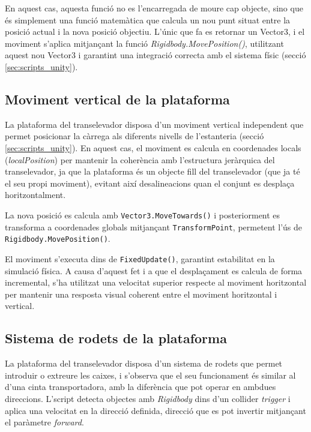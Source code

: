 \documentclass[a4paper,11pt,DIV=13,headings=normal,abstract=true,twoside=semi]{article}
\begin{document}
En aquest cas, aquesta funció  no es l'encarregada de moure cap objecte, sino que és simplement una funció matemàtica que calcula un nou punt situat entre la posició actual i la nova posició objectiu. L'únic que fa es retornar un Vector3, i el moviment s'aplica mitjançant la funció \emph{Rigidbody.MovePosition()}, utilitzant aquest nou Vector3 i garantint una integració correcta amb el sistema físic (secció \ref{sec:scripts_unity}).

\subsection*{Moviment vertical de la plataforma}

La plataforma del transelevador disposa d'un moviment vertical \cite{UnityElevatorVideo} independent que permet posicionar la càrrega als diferents nivells de l'estanteria (secció \ref{sec:scripts_unity}). En aquest cas, el moviment es calcula en coordenades locals (\emph{localPosition}) \cite{UnityTransformLocalPosition} per mantenir la coherència amb l'estructura jeràrquica del transelevador, ja que la plataforma és un objecte fill del transelevador (que ja té el seu propi moviment), evitant així desalineacions quan el conjunt es desplaça horitzontalment.

La nova posició es calcula amb \texttt{Vector3.MoveTowards()} i posteriorment es transforma a coordenades globals mitjançant \texttt{TransformPoint}, permetent l'ús de \texttt{Rigidbody.MovePosition()}.

El moviment s'executa dins de \texttt{FixedUpdate()}, garantint estabilitat en la simulació física. A causa d'aquest fet i a que el desplaçament es calcula de forma incremental, s'ha utilitzat una velocitat superior respecte al moviment horitzontal per mantenir una resposta visual coherent entre el moviment horitzontal i vertical.

\subsection*{Sistema de rodets de la plataforma}
\label{sec:rollers}
La plataforma del transelevador disposa d'un sistema de rodets que permet introduir o extreure les caixes, i s'observa que el seu funcionament és similar al d'una cinta transportadora, amb la diferència que pot operar en ambdues direccions.  L'script detecta objectes amb \emph{Rigidbody} \cite{UnityRigidbody} dins d'un collider \emph{trigger} i aplica una velocitat en la direcció definida, direcció que es pot invertir mitjançant el paràmetre \emph{forward}.
\end{document}
